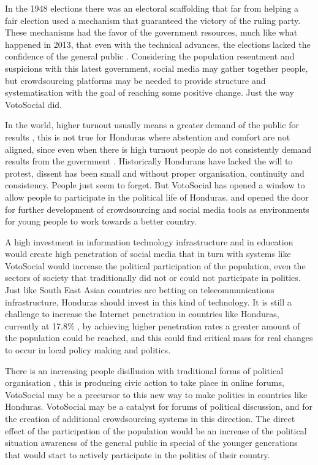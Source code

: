\documentclass[letterpaper,10pt]{article}
\begin{document}
In the 1948 elections there was an electoral scaffolding that far from helping a fair election used a mechanism that guaranteed the victory of the ruling party. These mechanisms had the favor of the government resources, much like what happened in 2013, that even with the technical advances, the elections lacked the confidence of the general public \citep{romero2014}. Considering the population resentment and suspicions with this latest government, social media may gather together people, but crowdsourcing platforms may be needed to provide structure and systematisation with the goal of reaching some positive change. Just the way VotoSocial did.

In the world, higher turnout usually means a greater demand of the public for results \citep{mac2003}, this is not true for Honduras where abstention and comfort are not aligned, since even when there is high turnout people do not consistently demand results from the government \citep{romero2014}. Historically Hondurans have lacked the will to protest, dissent has been small and without proper organisation, continuity and consistency. People just seem to forget. But VotoSocial has opened a window to allow people to participate in the political life of Honduras, and opened the door for further development of crowdsourcing and social media tools as environments for young people to work towards a better country.

A high investment in information technology infrastructure and in education would create high penetration of social media \citep{saadia2014} that in turn with systems like VotoSocial would increase the political participation of the population, even the sectors of society that traditionally did not or could not participate in politics. Just like South East Asian countries are betting on telecommunications infrastructure, Honduras should invest in this kind of technology. It is still a challenge to increase the Internet penetration in countries like Honduras, currently at 17.8\% \citep{webpenet}, by achieving higher penetration rates a greater amount of the population could be reached, and this could find critical mass for real changes to occur in local policy making and politics.

There is an increasing people disillusion with traditional forms of political organisation \citep{milan2013}, this is producing civic action to take place in online forums, VotoSocial may be a precursor to this new way to make politics in countries like Honduras. VotoSocial may be a catalyst for forums of political discussion, and for the creation of additional crowdsourcing systems in this direction. The direct effect of the participation of the population would be an increase of the political situation awareness of the general public in special of the younger generations that would start to actively participate in the politics of their country.
\end{document}
